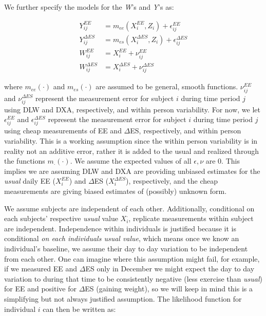 \documentclass[11pt]{article}\usepackage[]{graphicx}\usepackage[]{color}
\begin{document}
We further specify the models for the \emph{W}'s and \emph{Y}'s as:

\begin{align}
  \label{regressionfcn1} 
  Y_{ij}^{EE} &= m_{ee}(X_i^{EE} ,Z_i) + \epsilon_{ij}^{EE}  \\
  \label{regressionfcn2}
  Y_{ij}^{\Delta ES} &= m_{es}(X_i^{\Delta ES} ,Z_i) + \epsilon_{ij}^{\Delta ES} \\
  \label{gold1} 
  W_{ij}^{EE} &= X_i^{EE}  + \nu_{ij}^{EE}  \\
  \label{gold2}
  W_{ij}^{\Delta ES} &= X_i^{\Delta ES}  + \nu_{ij}^{\Delta ES} 
\end{align}

where $m_{ee}(\cdot)$ and $m_{es}(\cdot)$ are assumed to be general, smooth functions. $\nu_{ij}^{EE}$ and $\nu_{ij}^{\Delta ES}$ represent the measurement error for subject $i$ during time period $j$ using DLW and DXA, respectively, and within person variability. For now, we let $\epsilon_{ij}^{EE}$ and $\epsilon_{ij}^{\Delta ES}$ represent the measurement error for subject $i$ during time period $j$ using cheap measurements of EE and $\Delta$ES, respectively, and within person variability. This is a working assumption since the within person variability is in reality not an additive error, rather it is added to the usual and realized through the functions $m_{\cdot}(\cdot)$.  We assume the expected values of all $\epsilon,\nu$ are 0. This implies we are assuming DLW and DXA are providing unbiased estimates for the \emph{usual} daily EE ($X_i^{EE}$) and $\Delta$ES ($X_i^{\Delta ES}$), respectively, and the cheap measurements are giving biased estimates of (possibly) unknown form.


We assume subjects are independent of each other. Additionally, conditional on each subjects' respective \emph{usual} value $X_i^{\cdot}$, replicate measurements within subject are independent. Independence within individuals is justified because it is conditional \emph{on each individuals usual value}, which means once we know an individual's baseline, we assume their day to day variation to be independent from each other. One can imagine where this assumption might fail, for example, if we measured EE and $\Delta$ES only in December we might expect the day to day variation to during that time to be consistently negative (less exercise than \emph{usual}) for EE and positive for $\Delta$ES (gaining weight), so we will keep in mind this is a simplifying but not always justified assumption. The likelihood function for individual $i$ can then be written as:
\end{document}
